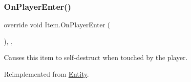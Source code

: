 \subsubsection{\texorpdfstring{On\+Player\+Enter()}{OnPlayerEnter()}}
{\footnotesize\ttfamily override void Item.\+On\+Player\+Enter (\begin{DoxyParamCaption}{ }\end{DoxyParamCaption})\hspace{0.3cm}{\ttfamily [inline]}, {\ttfamily [protected]}, {\ttfamily [virtual]}}



Causes this item to self-\/destruct when touched by the player. 



Reimplemented from \mbox{\hyperlink{class_entity_ad1e2bb09e463c33b64b26ba3306ba2d7}{Entity}}.

